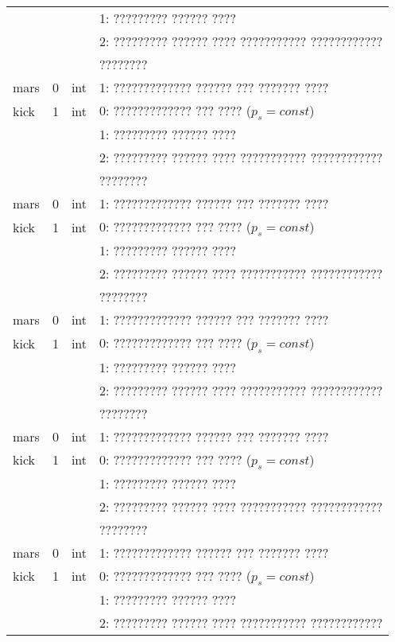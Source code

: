 \begin{longtable*}[c]{|l|c|l|l|}
    &   &     & 1: ????????? ?????? ????                  \\
    &   &     & 2: ????????? ?????? ???? ??????????? ???????????? \\
    & & & ????????    \\
    mars & 0 & int & 1: ????????????? ?????? ??? ??????? ????     \\
    kick & 1 & int & 0: ????????????? ??? ???? (\(p_s = const\)) \\
    &   &     & 1: ????????? ?????? ????                  \\
    &   &     & 2: ????????? ?????? ???? ??????????? ???????????? \\
    & & & ????????    \\
    mars & 0 & int & 1: ????????????? ?????? ??? ??????? ????     \\
    kick & 1 & int & 0: ????????????? ??? ???? (\(p_s = const\)) \\
    &   &     & 1: ????????? ?????? ????                  \\
    &   &     & 2: ????????? ?????? ???? ??????????? ???????????? \\
    & & & ????????    \\
    mars & 0 & int & 1: ????????????? ?????? ??? ??????? ????     \\
    kick & 1 & int & 0: ????????????? ??? ???? (\(p_s = const\)) \\
    &   &     & 1: ????????? ?????? ????                  \\
    &   &     & 2: ????????? ?????? ???? ??????????? ???????????? \\
    & & & ????????    \\
    mars & 0 & int & 1: ????????????? ?????? ??? ??????? ????     \\
    kick & 1 & int & 0: ????????????? ??? ???? (\(p_s = const\)) \\
    &   &     & 1: ????????? ?????? ????                  \\
    &   &     & 2: ????????? ?????? ???? ??????????? ???????????? \\
    & & & ????????    \\
    mars & 0 & int & 1: ????????????? ?????? ??? ??????? ????     \\
    kick & 1 & int & 0: ????????????? ??? ???? (\(p_s = const\)) \\
    &   &     & 1: ????????? ?????? ????                  \\
    &   &     & 2: ????????? ?????? ???? ??????????? ???????????? \\

\end{longtable*}
